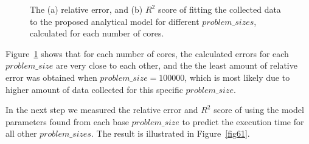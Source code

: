\vspace{\baselineskip}
\begin{figure}[H]
	\centering
	\label{fig59:a}
		\label{fig59:b}
	\caption{The (a) relative error, and (b) $R^2$ score of fitting the collected data to the proposed analytical model for different $problem\_{sizes}$, calculated for each number of cores.}\label{fig59}		
\end{figure}

Figure~\ref{fig59} shows that for each number of cores, the calculated errors for each $problem\_{size}$ are very close to each other, and the the least amount of relative error was obtained when $problem\_{size}=100000$, which is most likely due to higher amount of data collected for this specific $problem\_{size}$. 

In the next step we measured the relative error and $R^2$ score of using the model parameters found from each base $problem\_{size}$ to predict the execution time for all other $problem\_{sizes}$. The result is illustrated in Figure~\ref{fig61}.
 
